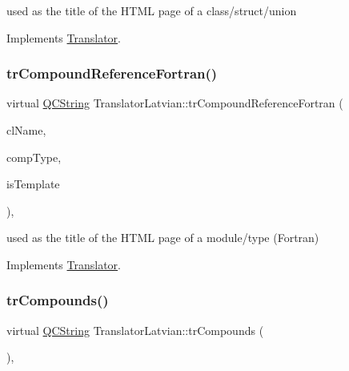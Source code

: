 used as the title of the H\+T\+ML page of a class/struct/union 

Implements \mbox{\hyperlink{class_translator}{Translator}}.

\mbox{\label{class_translator_latvian_a2e1b99339ebc667eb50776236ca2f7d1}} 
\subsubsection{\texorpdfstring{trCompoundReferenceFortran()}{trCompoundReferenceFortran()}}
{\footnotesize\ttfamily virtual \mbox{\hyperlink{class_q_c_string}{Q\+C\+String}} Translator\+Latvian\+::tr\+Compound\+Reference\+Fortran (\begin{DoxyParamCaption}\item[{const char $\ast$}]{cl\+Name,  }\item[{\mbox{\hyperlink{class_class_def_ae70cf86d35fe954a94c566fbcfc87939}{Class\+Def\+::\+Compound\+Type}}}]{comp\+Type,  }\item[{bool}]{is\+Template }\end{DoxyParamCaption})\hspace{0.3cm}{\ttfamily [inline]}, {\ttfamily [virtual]}}

used as the title of the H\+T\+ML page of a module/type (Fortran) 

Implements \mbox{\hyperlink{class_translator}{Translator}}.

\mbox{\label{class_translator_latvian_ac378d64a355fdeb5c4c5302d594f31b8}} 
\subsubsection{\texorpdfstring{trCompounds()}{trCompounds()}}
{\footnotesize\ttfamily virtual \mbox{\hyperlink{class_q_c_string}{Q\+C\+String}} Translator\+Latvian\+::tr\+Compounds (\begin{DoxyParamCaption}{ }\end{DoxyParamCaption})\hspace{0.3cm}{\ttfamily [inline]}, {\ttfamily [virtual]}}

